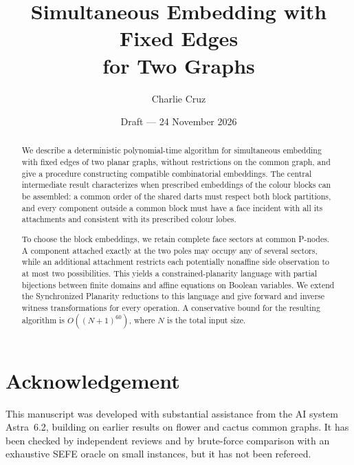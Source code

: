\documentclass[11pt,letterpaper]{article}
\title{Simultaneous Embedding with Fixed Edges\\[3pt]for Two Graphs}
\author{Charlie Cruz}
\date{Draft --- 24 November 2026}
\theoremstyle{definition}
\begin{document}
\maketitle
\vspace{-1.4em}
\begin{abstract}
We describe a deterministic polynomial-time algorithm for simultaneous
embedding with fixed edges of two planar graphs, without restrictions on
the common graph, and give a procedure constructing compatible
combinatorial embeddings.  The central intermediate result characterizes
when prescribed embeddings of the colour blocks can be assembled: a
common order of the shared darts must respect both block partitions,
and every component outside a common block must have a face incident
with all its attachments and consistent with its prescribed colour lobes.

To choose the block embeddings, we retain complete face sectors at common
P-nodes.  A component attached exactly at the two poles may occupy any
of several sectors, while an additional attachment restricts each
potentially nonaffine side observation to at most two possibilities.
This yields a constrained-planarity language with partial bijections
between finite domains and affine equations on Boolean variables.  We
extend the Synchronized Planarity reductions to this language and give
forward and inverse witness transformations for every operation.
A conservative bound for the resulting algorithm is
$O((N+1)^{60})$, where $N$ is the total input size.
\end{abstract}






\appendix


\section*{Acknowledgement}
This manuscript was developed with substantial assistance from the AI
system Astra~6.2, building on earlier results on flower and cactus common
graphs.  It has been checked by independent reviews and by brute-force
comparison with an exhaustive SEFE oracle on small instances, but it has
not been refereed.


\end{document}
